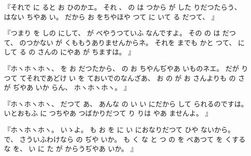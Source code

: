 %
『それで
に
ると
お
ひのかエ。
%
それ
、
%
の
は
つから
が
した
りだつたらう、
%
はない
ちやあ
い。
%
だから
お
をちやほや
つて
に
いて
る
だつて、
』

%
『つまり
を
しの
にして、
%
が
べやうつていふ
なんですよ。
%
その
の
は
だつて、
%
のつかない
が
くももうありませんからネ。
%
それを
までも
かと
つて、
%
にして
る
の
さんの
にやあ
が
ちますは。
』

%
『ホヽホヽホヽ、
%
を
お
だつたから、
%
の
お
ちやんぢやあ
いものネエ。
%
だが
り
つて
てそれであどけ
い
を
ておいでのなんざあ、
%
お
の
が
お
さんよりも
の
さが
ぢやあ
いか
らん、
%
ホヽホヽホヽ。
』

%
『ホヽホヽホヽ、
%
だつて
あ、
%
あんな
の
い
い
にだから
して
られるのですは。
%
いとおもふ
に
つちやあ
つばかりだつて
り
りは
やあ
ませんよ。
』

%
『ホヽホヽホヽ。
%
いゝよ。
%
も
お
を
に
い
におなりだつて
ひや
ないから。
%
で、
%
さういふわけなら
の
ぢや
いか。
%
も
く
な
と
つ
の
を
べあつて
を
くする
な
を、
%
い
に
た
が
からうぢやあ
いか。
』

